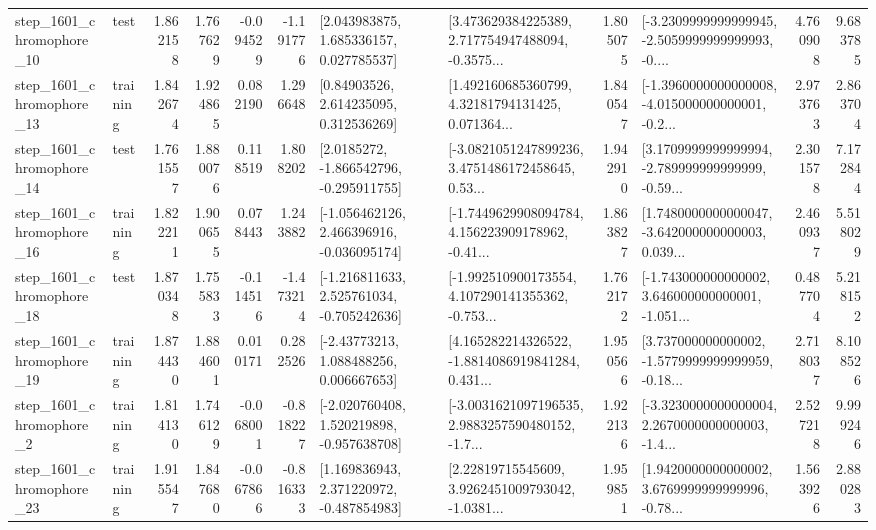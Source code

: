 \begin{tabular}{llrrrrllrlrr}
 step\_1601\_chromophore\_10 &      test &      1.862158 &    1.767629 &     -0.094529 & -1.191776 &     [2.043983875, 1.685336157, 0.027785537] &  [3.473629384225389, 2.717754947488094, -0.3575... &       1.805075 &  [-3.2309999999999945, -2.5059999999999993, -0.... &            4.760908 &          9.683785 \\
 step\_1601\_chromophore\_13 &  training &      1.842674 &    1.924865 &      0.082190 &  1.296648 &      [0.84903526, 2.614235095, 0.312536269] &  [1.492160685360799, 4.32181794131425, 0.071364... &       1.840547 &  [-1.3960000000000008, -4.015000000000001, -0.2... &            2.973763 &          2.863704 \\
 step\_1601\_chromophore\_14 &      test &      1.761557 &    1.880076 &      0.118519 &  1.808202 &     [2.0185272, -1.866542796, -0.295911755] &  [-3.0821051247899236, 3.4751486172458645, 0.53... &       1.942910 &  [3.1709999999999994, -2.789999999999999, -0.59... &            2.301578 &          7.172844 \\
 step\_1601\_chromophore\_16 &  training &      1.822211 &    1.900655 &      0.078443 &  1.243882 &   [-1.056462126, 2.466396916, -0.036095174] &  [-1.7449629908094784, 4.156223909178962, -0.41... &       1.863827 &  [1.7480000000000047, -3.642000000000003, 0.039... &            2.460937 &          5.518029 \\
 step\_1601\_chromophore\_18 &      test &      1.870348 &    1.755833 &     -0.114516 & -1.473214 &   [-1.216811633, 2.525761034, -0.705242636] &  [-1.992510900173554, 4.107290141355362, -0.753... &       1.762172 &  [-1.743000000000002, 3.646000000000001, -1.051... &            0.487704 &          5.218152 \\
 step\_1601\_chromophore\_19 &  training &      1.874430 &    1.884601 &      0.010171 &  0.282526 &     [-2.43773213, 1.088488256, 0.006667653] &  [4.165282214326522, -1.8814086919841284, 0.431... &       1.950566 &  [3.737000000000002, -1.5779999999999959, -0.18... &            2.718037 &          8.108526 \\
  step\_1601\_chromophore\_2 &  training &      1.814130 &    1.746129 &     -0.068001 & -0.818227 &   [-2.020760408, 1.520219898, -0.957638708] &  [-3.0031621097196535, 2.9883257590480152, -1.7... &       1.922136 &  [-3.3230000000000004, 2.2670000000000003, -1.4... &            2.527218 &          9.999246 \\
 step\_1601\_chromophore\_23 &  training &      1.915547 &    1.847680 &     -0.067866 & -0.816333 &    [1.169836943, 2.371220972, -0.487854983] &  [2.22819715545609, 3.9262451009793042, -1.0381... &       1.959851 &  [1.9420000000000002, 3.6769999999999996, -0.78... &            1.563926 &          2.880283 \\

\end{tabular}
